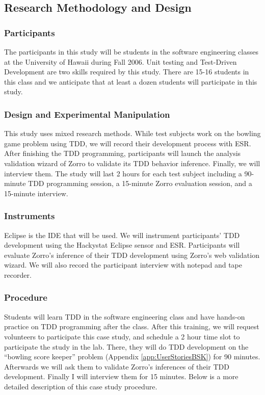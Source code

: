 \subsection{Research Methodology and Design}
\subsubsection{Participants}
The participants in this study will be students in the software
engineering classes at the University of Hawaii during Fall 2006. Unit
testing and Test-Driven Development are two skills required by this
study. There are 15-16 students in this class and we anticipate that
at least a dozen students will participate in this study.

\subsubsection{Design and Experimental Manipulation}
This study uses mixed research methods\cite{Creswell:03}. While test
subjects work on the bowling game problem using TDD, we will record
their development process with ESR\cite{esr}. After finishing the TDD
programming, participants will launch the analysis validation wizard
of Zorro to validate its TDD behavior inference. Finally, we will
interview them. The study will last 2 hours for each test subject
including a 90-minute TDD programming session, a 15-minute Zorro
evaluation session, and a 15-minute interview.

\subsubsection{Instruments}
Eclipse is the IDE that will be used. We will instrument participants'
TDD development using the Hackystat Eclipse sensor\cite{SensorInstall}
and ESR\cite{esr}. Participants will evaluate Zorro's inference of
their TDD development using Zorro's web validation wizard. We will
also record the participant interview with notepad and tape recorder.

\subsubsection{Procedure}
Students will learn TDD in the software engineering class and have
hands-on practice on TDD programming after the class. After this
training, we will request volunteers to participate this case study,
and schedule a 2 hour time slot to participate the study in the lab.
There, they will do TDD development on the ``bowling score keeper''
problem (Appendix \ref{app:UserStoriesBSK}) for 90 minutes. Afterwards we
will ask them to validate Zorro's inferences of their TDD
development. Finally I will interview them for 15 minutes. Below is a
more detailed description of this case study procedure.

